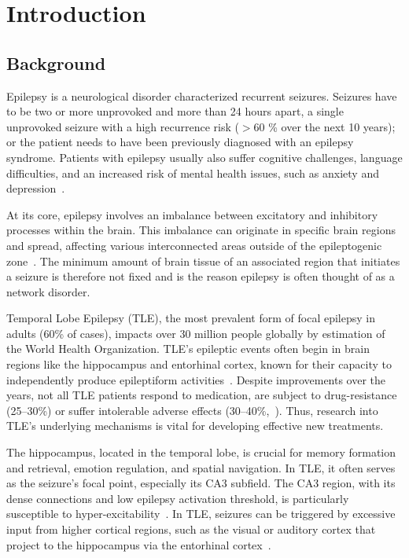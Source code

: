 \chapter{Introduction}\label{ch:introduction}
\pagestyle{fancy} %

\section{Background}
Epilepsy is a neurological disorder characterized recurrent seizures.
Seizures have to be two or more unprovoked and more than 24 hours apart, a single unprovoked
seizure with a high recurrence risk (\(>\)60 \% over the next 10 years); or the patient needs to have been previously diagnosed with an epilepsy syndrome.
Patients with epilepsy usually also suffer cognitive challenges, language difficulties, and an increased risk of mental health issues,
such as anxiety and depression~\parencite{fisherILAEOfficialReport2014}.

At its core, epilepsy involves an imbalance between excitatory and inhibitory processes within the brain.
This imbalance can originate in specific brain regions and spread, affecting various interconnected areas
outside of the epileptogenic zone~\parencite{ludersEpileptogenicZoneGeneral2006}.
The minimum amount of brain tissue of an associated region that initiates a seizure is therefore not fixed and is the
reason epilepsy is often thought of as a network disorder.

Temporal Lobe Epilepsy (TLE), the most prevalent form of focal epilepsy in adults (60\% of cases),
impacts over 30 million people globally by estimation of the World Health Organization.
TLE's epileptic events often begin in brain regions like the hippocampus and entorhinal cortex, known for their
capacity to independently produce epileptiform activities~\parencite{lyttonComputerSimulationEpilepsy2005}.
Despite improvements over the years, not all TLE patients respond to medication, are subject to drug-resistance (25--30\%) or
suffer intolerable adverse effects (30--40\%,~\textcite{hakamiEfficacyTolerabilityAntiseizure2021}). Thus, research into TLE's
underlying mechanisms is vital for developing effective new treatments.

The hippocampus, located in the temporal lobe, is crucial for memory formation
and retrieval, emotion regulation, and spatial navigation. In TLE, it often
serves as the seizure's focal point, especially its CA3 subfield. The CA3 region,
with its dense connections and low epilepsy activation threshold, is particularly
susceptible to hyper-excitability~\parencite{witterIntrinsicExtrinsicWiring2007}.
In TLE, seizures can be triggered by excessive input from higher cortical regions, such as the visual or auditory cortex
that project to the hippocampus via the entorhinal cortex~\parencite{manganottiInfluenceSomatosensoryInput1998}.

